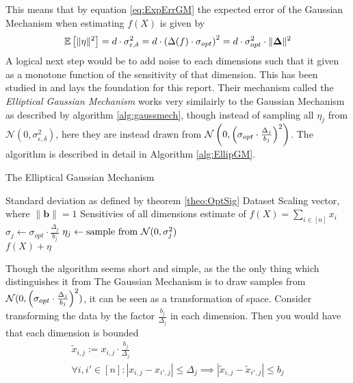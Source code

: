 \documentclass[a4paper,12pt]{article}
\newcommand{\Desc}[2]{\State \makebox[6em][l]{#1}#2}
\begin{document}
\noindent This means that by equation \eqref{eq:ExpErrGM} the expected error of the Gaussian Mechanism when estimating $f(X)$ is given by
\begin{equation}
\label{eq:GMErr}
    \mathbb{E} \left [ \| \eta \|^2 \right] = d \cdot \sigma_{\varepsilon, \delta}^2 = d \cdot \left (\Delta(f) \cdot \sigma_{opt}\right)^2 =
    d  \cdot \sigma_{opt}^2 \cdot \| \bm{\Delta} \|^2 
\end{equation}
A logical next step would be to add noise to each dimensions such that it given as a monotone function of the sensitivity of that dimension.
This has been studied in \cite{Lebeda2022} and lays the foundation for this report. Their mechanism called the \textit{Elliptical Gaussian Mechanism}
works very similairly to the Gaussian Mechanism as described by algorithm \ref{alg:gaussmech}, though instead of sampling all $\eta_j$ from 
$\mathcal{N}(0,\sigma_{\epsilon, \delta}^2)$, here they are instead drawn from $\mathcal{N}\left (0,\left (\sigma_{opt}\cdot \frac{\Delta_j}{b_j}\right)^2\right)$. 
The algorithm is described in detail in Algorithm \ref{alg:EllipGM}.

\begin{algorithm}
\caption{The Elliptical Gaussian Mechanism}\label{alg:EllipGM}
\begin{algorithmic}
    \Input
    \Desc{$\sigma_{opt}$}{Standard deviation as defined by theorem \ref{theo:OptSig}}
    \Desc{$X \in \R^{n \times d}$}{Dataset}
    \Desc{$\bm{b} \in \R^{d}$}{Scaling vector, where $\|\bm{b}\| = 1$}
    \Desc{$\bm{\Delta} \in \R^{d}$}{Sensitivies of all dimensions}
    \EndInput
    \Output
    \State \edp estimate of $f(X) = \sum_{i \in [n]} x_i$
    \EndOutput
        \State $\sigma_j \gets \sigma_{opt} \cdot \frac{\Delta_j}{b_j}$
        \State $\eta_j \gets \textnormal{sample from } \mathcal{N}(0, \sigma_j^2)$
    \EndFor \\
    \Return $f(X) + \eta$
\end{algorithmic}
\end{algorithm}

Though the algorithm seems short and simple, as the the only thing which distinguishes it from The Gaussian Mechanism 
is to draw samples from $\mathcal{N}(0, \left (\sigma_{opt} \cdot \frac{\Delta_j}{b_j}\right)^2)$, 
it can be seen as a transformation of space. Consider transforming the data by the factor $\frac{b_j}{\Delta_j}$ in each dimension. 
Then you would have that each dimension is bounded
\begin{gather*}
    \tilde{x}_{i,j} := x_{i,j} \cdot \frac{b_j}{\Delta_j} \\
    \forall i,i' \in [n] : |x_{i,j} - x_{i',j}| \le \Delta_j \implies |\tilde{x}_{i,j} - \tilde{x}_{i',j}| \le b_j
\end{gather*}
\end{document}
